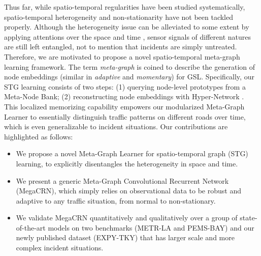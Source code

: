 \documentclass[letterpaper]{article} \usepackage{aaai23}  \usepackage{times}  \usepackage{helvet}  \usepackage{courier}  \usepackage[hyphens]{url}  \usepackage{graphicx} \urlstyle{rm} \def\UrlFont{\rm}  \usepackage{natbib}  \usepackage{caption} \usepackage{multirow}
\begin{document}
Thus far, while spatio-temporal regularities have been studied systematically, spatio-temporal heterogeneity and non-stationarity have not been tackled properly. Although the heterogeneity issue can be alleviated to some extent by applying attentions over the space and time \cite{guo2019attention, zheng2020gman}, sensor signals of different natures are still left entangled, not to mention that incidents are simply untreated. Therefore, we are motivated to propose a novel spatio-temporal meta-graph learning framework. The term \textit{meta-graph} is coined to describe the generation of node embeddings (similar in \textit{adaptive} and \textit{momentary}) for GSL. Specifically, our STG learning consists of two steps: (1) querying node-level prototypes from a Meta-Node Bank; (2) reconstructing node embeddings with Hyper-Network \cite{ha2016hypernetworks}. This localized memorizing capability empowers our modularized Meta-Graph Learner to essentially distinguish traffic patterns on different roads over time, which is even generalizable to incident situations. Our contributions are highlighted as follows:
\begin{itemize}
\item We propose a novel Meta-Graph Learner for spatio-temporal graph (STG) learning, to explicitly disentangles the heterogeneity in space and time.
\item We present a generic Meta-Graph Convolutional Recurrent Network (MegaCRN), which simply relies on observational data to be robust and adaptive to any traffic situation, from normal to non-stationary.
\item We validate MegaCRN quantitatively and qualitatively over a group of state-of-the-art models on two benchmarks (METR-LA and PEMS-BAY) and our newly published dataset (EXPY-TKY) that has larger scale and more complex incident situations.
\end{itemize}
\end{document}
